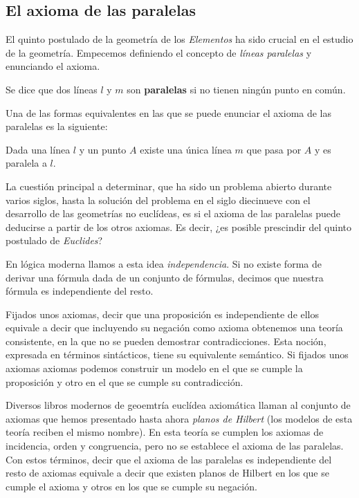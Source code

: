 \subsection{El axioma de las paralelas}

El quinto postulado de la geometría de los \textit{Elementos} ha sido crucial en
el estudio de la geometría. Empecemos definiendo el concepto de \textit{líneas
	paralelas} y enunciando el axioma.

\begin{defin*}
	Se dice que dos líneas $l$ y $m$ son \textbf{paralelas} si no tienen ningún
	punto en común.
\end{defin*}

Una de las formas equivalentes en las que se puede enunciar el axioma de las
paralelas es la siguiente:


\begin{axb}[P]\label{ax:P}
	Dada una línea $l$ y un punto $A$ existe una única línea $m$ que pasa por
	$A$ y es paralela a $l$.
\end{axb}


La cuestión principal a determinar, que ha sido un problema abierto durante
varios siglos, hasta la solución del problema en el siglo diecinueve con el
desarrollo de las geometrías no euclídeas, es si el axioma de las paralelas
puede deducirse a partir de los otros axiomas. Es decir, ¿es posible prescindir
del quinto postulado de \textit{Euclides}?

En lógica moderna llamos a esta idea \textit{independencia}. Si no existe forma
de derivar una fórmula dada de un conjunto de fórmulas, decimos que nuestra
fórmula es independiente del resto.

Fijados unos axiomas, decir que una proposición es independiente de ellos
equivale a decir que incluyendo su negación como axioma
obtenemos una teoría consistente, en la que no se pueden demostrar
contradicciones. Esta noción, expresada en términos sintácticos, tiene su
equivalente semántico. Si fijados unos axiomas axiomas podemos construir un
modelo en el que se cumple la proposición y otro en el que se cumple su
contradicción.

Diversos libros modernos de geoemtría euclídea axiomática llaman al conjunto de
axiomas que hemos presentado hasta ahora \textit{planos de Hilbert} (los modelos
de esta teoría reciben el mismo nombre). En esta teoría se cumplen los axiomas
de incidencia, orden y congruencia, pero no se establece el axioma de las
paralelas. Con estos términos, decir que el axioma de las paralelas es
independiente del resto de axiomas equivale a decir que existen planos de
Hilbert en los que se cumple el axioma y otros en los que se cumple su negación.

